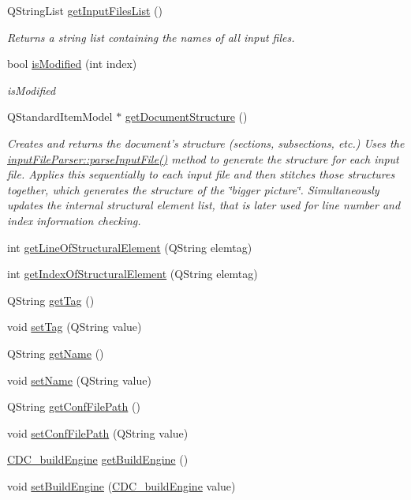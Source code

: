 \begin{DoxyCompactItemize}
Q\+String\+List \hyperlink{classdocument_worker_a827ee0e7099be86c5d20c2fe2fbbafe7}{get\+Input\+Files\+List} ()
\begin{DoxyCompactList}\small\item\em Returns a string list containing the names of all input files. \end{DoxyCompactList}\item 
bool \hyperlink{classdocument_worker_a3549424368574c196404d135eb454a21}{is\+Modified} (int index)
\begin{DoxyCompactList}\small\item\em is\+Modified \end{DoxyCompactList}\item 
Q\+Standard\+Item\+Model $\ast$ \hyperlink{classdocument_worker_a46683d81223a5d0fff3606338e15af9d}{get\+Document\+Structure} ()
\begin{DoxyCompactList}\small\item\em Creates and returns the document's structure (sections, subsections, etc.) Uses the \hyperlink{classinput_file_parser_ad632f2b78c34b72cbaf8105b8762cf9f}{input\+File\+Parser\+::parse\+Input\+File()} method to generate the structure for each input file. Applies this sequentially to each input file and then stitches those structures together, which generates the structure of the \char`\"{}bigger picture\char`\"{}. Simultaneously updates the internal structural element list, that is later used for line number and index information checking. \end{DoxyCompactList}\item 
int \hyperlink{classdocument_worker_a480cf18ca31e3275cb2ea99a1e5b838d}{get\+Line\+Of\+Structural\+Element} (Q\+String elemtag)
\item 
int \hyperlink{classdocument_worker_ac793de2aa348e0d86fb14fa7b14e2f83}{get\+Index\+Of\+Structural\+Element} (Q\+String elemtag)
\item 
Q\+String \hyperlink{classdocument_worker_a9d582a2b8ebb32779ac0b63f3328761a}{get\+Tag} ()
\item 
void \hyperlink{classdocument_worker_ac405fdf4aef95008f2ab00db978017ed}{set\+Tag} (Q\+String value)
\item 
Q\+String \hyperlink{classdocument_worker_abd073cc857adc0df597e6db51449f132}{get\+Name} ()
\item 
void \hyperlink{classdocument_worker_a5b8cf60dd7735536ff94323bebb539f4}{set\+Name} (Q\+String value)
\item 
Q\+String \hyperlink{classdocument_worker_a7c63b5e0013522cc3cac9c347b8a95a5}{get\+Conf\+File\+Path} ()
\item 
void \hyperlink{classdocument_worker_a46f83322e76b85ebc067d48b7b00d5d6}{set\+Conf\+File\+Path} (Q\+String value)
\item 
\hyperlink{cdcdefs_8h_abd38cc943467f0d66216a60454d5ee06}{C\+D\+C\+\_\+build\+Engine} \hyperlink{classdocument_worker_aa33dbe64a646425038a1c80984ba7e17}{get\+Build\+Engine} ()
\item 
void \hyperlink{classdocument_worker_aea01eceaa4dfee75a4ef827a0e300558}{set\+Build\+Engine} (\hyperlink{cdcdefs_8h_abd38cc943467f0d66216a60454d5ee06}{C\+D\+C\+\_\+build\+Engine} value)
\end{DoxyCompactItemize}

